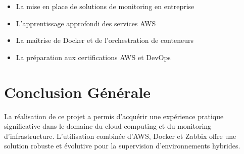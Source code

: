 \begin{itemize}
    \item La mise en place de solutions de monitoring en entreprise
    \item L'apprentissage approfondi des services AWS
    \item La maîtrise de Docker et de l'orchestration de conteneurs
    \item La préparation aux certifications AWS et DevOps
\end{itemize}

\section{Conclusion Générale}

La réalisation de ce projet a permis d'acquérir une expérience pratique significative dans le domaine du cloud computing et du monitoring d'infrastructure. L'utilisation combinée d'AWS, Docker et Zabbix offre une solution robuste et évolutive pour la supervision d'environnements hybrides.

\vspace{1cm}

\begin{center}
\end{center}
